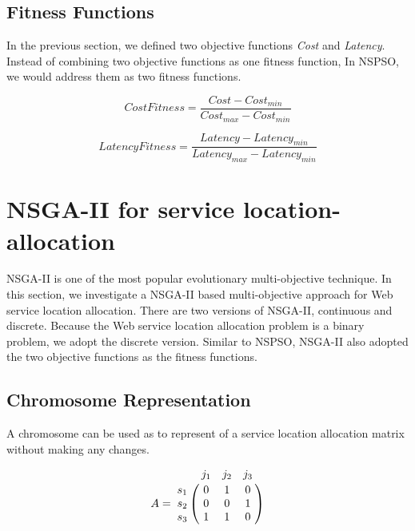 \subsection{Fitness Functions}
\label{sec:nspsofitness}
In the previous section, we defined two objective functions \emph{Cost} and \emph{Latency}. Instead of 
combining two objective functions as one fitness function, 
In NSPSO, we would address them as two fitness functions.

 \begin{equation}
 	\label{eq:cost_prime}
 	CostFitness = \frac{Cost - Cost_{min}}{Cost_{max} - Cost_{min}}
 \end{equation}
 
 \begin{equation}
 	\label{eq:latency_prime}
 	LatencyFitness = \frac{Latency - Latency_{min}}{Latency_{max} - Latency_{min}}
 \end{equation}



\section{NSGA-II for service location-allocation}
NSGA-II is one of the most popular evolutionary multi-objective technique.
In this section, we investigate a NSGA-II based multi-objective approach for Web service location allocation.
There are two versions of NSGA-II, continuous and discrete. Because the Web service location allocation problem is a binary problem, we adopt the 
discrete version.
Similar to NSPSO, NSGA-II also adopted the two objective functions as the fitness functions.


\subsection{Chromosome Representation}
A chromosome can be used as to represent of a service location allocation matrix without making any changes.

$$
A = \bbordermatrix{~ & j_{1} & j_{2} & j_{3}\cr
					s_{1}	&0 &1 &0	\cr
					s_{2}	&0  &0 &1	\cr
					s_{3}	&1 &1 &0	\cr}
$$



